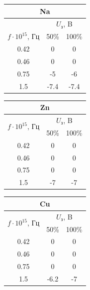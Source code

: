 \documentclass[a4paper,14pt]{extreport}
\begin{document}
	\begin{table}[h]
			\begin{center}
				\begin{tabular}{|c|c|c|}
					\hline
					\multicolumn{3}{|c|}{\cellcolor[HTML]{DAE8FC}Na} \\ \hline
					 & \multicolumn{2}{c|}{$U_{\text{з}}$, B} \\ \cline{2-3} 
					\multirow{-2}{*}{$f\cdot 10^{15}$, Гц} & 50\% & 100\% \\ \hline
					0.42 & 0 & 0 \\ \hline
					0.46 & 0 & 0 \\ \hline
					0.75 & -5 & -6 \\ \hline
					1.5 & -7.4 & -7.4 \\ \hline
				\end{tabular}
				\begin{tabular}{|c|c|c|}
					\hline
					\multicolumn{3}{|c|}{\cellcolor[HTML]{FFFC9E}Zn} \\ \hline
					\multirow{2}{*}{$f\cdot 10^{15}$, Гц} & \multicolumn{2}{c|}{$U_{\text{з}}$, B} \\ \cline{2-3} 
					 & 50\% & 100\% \\ \hline
					0.42 & 0 & 0 \\ \hline
					0.46 & 0 & 0 \\ \hline
					0.75 & 0 & 0 \\ \hline
					1.5 & -7 & -7 \\ \hline
				\end{tabular}
				\begin{tabular}{|c|c|c|}
					\hline
					\multicolumn{3}{|c|}{\cellcolor[HTML]{9AFF99}Cu} \\ \hline
					\multirow{2}{*}{$f\cdot 10^{15}$, Гц} & \multicolumn{2}{c|}{$U_{\text{з}}$, B} \\ \cline{2-3} 
					 & 50\% & 100\% \\ \hline
					0.42 & 0 & 0 \\ \hline
					0.46 & 0 & 0 \\ \hline
					0.75 & 0 & 0 \\ \hline
					1.5 & -6.2 & -7 \\ \hline
				\end{tabular}
			\end{center}
	\end{table}	
\end{document}
